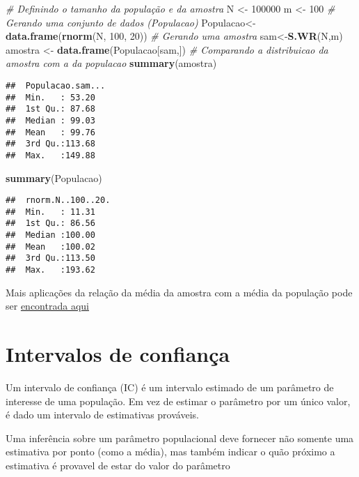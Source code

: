 \documentclass[]{book}
\newenvironment{Shaded}{\begin{snugshade}}{\end{snugshade}}
\newcommand{\KeywordTok}[1]{\textcolor[rgb]{0.13,0.29,0.53}{\textbf{#1}}}
\newcommand{\DecValTok}[1]{\textcolor[rgb]{0.00,0.00,0.81}{#1}}
\newcommand{\StringTok}[1]{\textcolor[rgb]{0.31,0.60,0.02}{#1}}
\newcommand{\CommentTok}[1]{\textcolor[rgb]{0.56,0.35,0.01}{\textit{#1}}}
\newcommand{\NormalTok}[1]{#1}
\theoremstyle{definition}
\theoremstyle{definition}
\theoremstyle{definition}
\theoremstyle{remark}
\begin{document}
\begin{Shaded}
\begin{Highlighting}[]
\CommentTok{# Definindo o tamanho da população e da amostra }
\NormalTok{N <-}\StringTok{ }\DecValTok{100000}
\NormalTok{m <-}\StringTok{ }\DecValTok{100}
\CommentTok{# Gerando uma conjunto de dados (Populacao)}
\NormalTok{Populacao<-}\StringTok{ }\KeywordTok{data.frame}\NormalTok{(}\KeywordTok{rnorm}\NormalTok{(N, }\DecValTok{100}\NormalTok{, }\DecValTok{20}\NormalTok{))}
\CommentTok{# Gerando uma amostra}
\NormalTok{sam<-}\KeywordTok{S.WR}\NormalTok{(N,m)}
\NormalTok{amostra <-}\StringTok{ }\KeywordTok{data.frame}\NormalTok{(Populacao[sam,])}
\CommentTok{# Comparando a distribuicao da amostra com a da populacao}
\KeywordTok{summary}\NormalTok{(amostra)}
\end{Highlighting}
\end{Shaded}

\begin{verbatim}
##  Populacao.sam...
##  Min.   : 53.20  
##  1st Qu.: 87.68  
##  Median : 99.03  
##  Mean   : 99.76  
##  3rd Qu.:113.68  
##  Max.   :149.88
\end{verbatim}

\begin{Shaded}
\begin{Highlighting}[]
\KeywordTok{summary}\NormalTok{(Populacao)}
\end{Highlighting}
\end{Shaded}

\begin{verbatim}
##  rnorm.N..100..20.
##  Min.   : 11.31   
##  1st Qu.: 86.56   
##  Median :100.00   
##  Mean   :100.02   
##  3rd Qu.:113.50   
##  Max.   :193.62
\end{verbatim}

Mais aplicações da relação da média da amostra com a média da população
pode ser \href{https://stevendutt.shinyapps.io/distamostral/}{encontrada
aqui}

\chapter{Intervalos de confiança}\label{intervalos-de-confianca}

Um intervalo de confiança (IC) é um intervalo estimado de um parâmetro
de interesse de uma população. Em vez de estimar o parâmetro por um
único valor, é dado um intervalo de estimativas prováveis.

Uma inferência sobre um parâmetro populacional deve fornecer não somente
uma estimativa por ponto (como a média), mas também indicar o quão
próximo a estimativa é provavel de estar do valor do parâmetro
\citet{Agresti}
\end{document}
